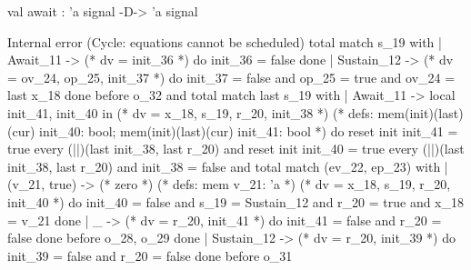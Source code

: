 \runverbatimfalse
{}
\begin{RunVerbatimMsg}
val await : 'a signal -D-> 'a signal
\end{RunVerbatimMsg}
\begin{RunVerbatimErr}
Internal error (Cycle: equations cannot be scheduled)
 total match s_19 with
 | Await_11 ->  (* dv = {init_36} *)
                do init_36 = false done
 | Sustain_12 -> 
     (* dv = {ov_24, op_25, init_37} *)
     do init_37 = false and op_25 = true and ov_24 = last x_18 done
  before {o_32}
 and total match last s_19 with
     | Await_11 -> 
         local init_41, init_40 in
         (* dv = {x_18, s_19, r_20, init_38} *)
         (* defs: mem(init)(last)(cur) init_40: bool;
                  mem(init)(last)(cur) init_41: bool *)
         do reset init init_41 = true 
            every (||)(last init_38, last r_20)
         and reset init init_40 = true 
             every (||)(last init_38, last r_20)
         and init_38 = false
         and total match (ev_22, ep_23) with
             | (v_21, true) -> (* zero *)
                 (* defs: mem v_21: 'a *)
                 (* dv = {x_18, s_19, r_20, init_40} *)
                 do init_40 = false
                 and s_19 = Sustain_12 and r_20 = true and x_18 = v_21 done
             | _ -> 
                 (* dv = {r_20, init_41} *)
                 do init_41 = false and r_20 = false done
              before {o_28, o_29}
         done
     | Sustain_12 -> 
         (* dv = {r_20, init_39} *)
         do init_39 = false and r_20 = false done
      before {o_31}
 
\end{RunVerbatimErr}
